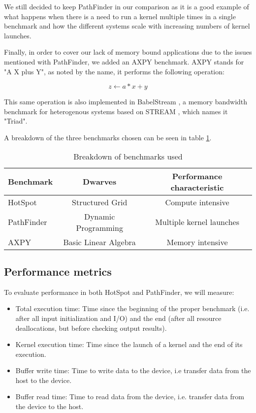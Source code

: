 We still decided to keep PathFinder in our comparison as it is a good example of what happens when there is a need to run a kernel multiple times in a single benchmark and how the different systems scale with increasing numbers of kernel launches.

Finally, in order to cover our lack of memory bound applications due to the issues mentioned with PathFinder, we added an AXPY benchmark. AXPY stands for "A X plus Y", as noted by the name, it performs the following operation:

\[
    z \leftarrow a*x+y
\]

This same operation is also implemented in BabelStream \cite{babelstream}, a memory bandwidth benchmark for heterogenous systems based on STREAM \cite{stream}, which names it "Triad". 

A breakdown of the three benchmarks chosen can be seen in table \ref{tab:benchmark-breakdown}.

\begin{table}[ht]
    \centering
    \begin{tabular}{l|c|c}
    Benchmark & Dwarves & Performance characteristic \\ \hline
    HotSpot & Structured Grid & Compute intensive \\
    PathFinder & Dynamic Programming & Multiple kernel launches \\
    AXPY & Basic Linear Algebra & Memory intensive          
    \end{tabular}
    \captionsetup{justification=centering}
    \caption{Breakdown of benchmarks used}
    \label{tab:benchmark-breakdown}
\end{table}

\subsection{Performance metrics}

To evaluate performance in both HotSpot and PathFinder, we will measure:

\begin{itemize}
    \item Total execution time: Time since the beginning of the proper benchmark (i.e. after all input initialization and I/O) and the end (after all resource deallocations, but before checking output results).
    \item Kernel execution time: Time since the launch of a kernel and the end of its execution.
    \item Buffer write time: Time to write data to the device, i.e transfer data from the host to the device.
    \item Buffer read time: Time to read data from the device, i.e. transfer data from the device to the host.
\end{itemize}

